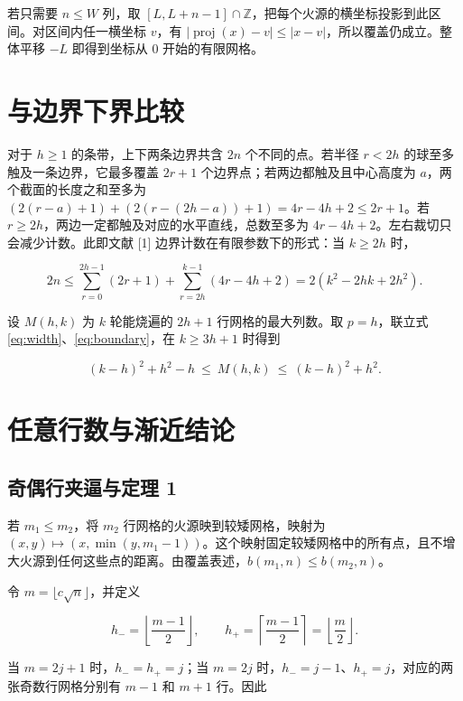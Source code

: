 \documentclass[UTF8,a4paper,11pt,fontset=fandol]{ctexart}
\begin{document}
若只需要 $n\le W$ 列，取 $[L,L+n-1]\cap\mathbb{Z}$，把每个火源的横坐标投影到此区间。对区间内任一横坐标 $v$，有 $|\operatorname{proj}(x)-v|\le |x-v|$，所以覆盖仍成立。整体平移 $-L$ 即得到坐标从 $0$ 开始的有限网格。

\section{与边界下界比较}

对于 $h\ge1$ 的条带，上下两条边界共含 $2n$ 个不同的点。若半径 $r<2h$ 的球至多触及一条边界，它最多覆盖 $2r+1$ 个边界点；若两边都触及且中心高度为 $a$，两个截面的长度之和至多为 $(2(r-a)+1)+(2(r-(2h-a))+1)=4r-4h+2\le2r+1$。若 $r\ge2h$，两边一定都触及对应的水平直线，总数至多为 $4r-4h+2$。左右裁切只会减少计数。此即文献 [1] 边界计数在有限参数下的形式：当 $k\ge2h$ 时，

\begin{equation}\label{eq:boundary}
2n\le \sum_{r=0}^{2h-1}(2r+1)
       +\sum_{r=2h}^{k-1}(4r-4h+2)
     =2(k^2-2hk+2h^2).
\end{equation}

设 $M(h,k)$ 为 $k$ 轮能烧遍的 $2h+1$ 行网格的最大列数。取 $p=h$，联立式 \eqref{eq:width}、\eqref{eq:boundary}，在 $k\ge3h+1$ 时得到

\begin{equation}\label{eq:sandwich}
(k-h)^2+h^2-h\ \le\ M(h,k)\ \le\ (k-h)^2+h^2.
\end{equation}

\section{任意行数与渐近结论}

\subsection{奇偶行夹逼与定理 1}

若 $m_1\le m_2$，将 $m_2$ 行网格的火源映到较矮网格，映射为 $(x,y)\mapsto(x,\min(y,m_1-1))$。这个映射固定较矮网格中的所有点，且不增大火源到任何这些点的距离。由覆盖表述，$b(m_1,n)\le b(m_2,n)$。

令 $m=\lfloor c\sqrt{n}\rfloor$，并定义

\[
h_-=\left\lfloor\frac{m-1}{2}\right\rfloor,\qquad
h_+=\left\lceil\frac{m-1}{2}\right\rceil=\left\lfloor\frac m2\right\rfloor.
\]

当 $m=2j+1$ 时，$h_-=h_+=j$；当 $m=2j$ 时，$h_-=j-1$、$h_+=j$，对应的两张奇数行网格分别有 $m-1$ 和 $m+1$ 行。因此
\end{document}
